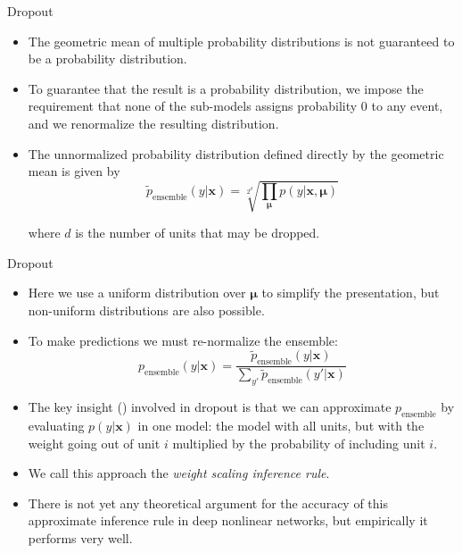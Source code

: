 \documentclass[10pt]{beamer}
\begin{document}
	\begin{frame}{Dropout}
		\begin{itemize}
			\item The geometric mean of multiple probability distributions is not guaranteed to be a probability distribution.
			\pause
			\item To guarantee that the result is a probability distribution, we impose the requirement that none of the sub-models assigns probability 0 to any event, and we renormalize the resulting distribution.
			\pause
			\item The unnormalized probability distribution defined directly by the geometric mean is given by
			$$\tilde{p}_{\text{ensemble}}(y|\bm{x})=\sqrt[2^d]{\prod_{\bm{\mu}}p(y|\bm{x},\bm{\mu})}$$
			
			where $d$ is the number of units that may be dropped.
		\end{itemize}
	\end{frame}
	
	\begin{frame}{Dropout}
		\begin{itemize}
			\item Here we use a uniform distribution over $\bm{\mu}$ to simplify the presentation, but non-uniform distributions are also possible.
			\pause
			\item To make predictions we must re-normalize the ensemble:
			$$p_{\text{ensemble}}(y|\bm{x})=\frac{\tilde{p}_{\text{ensemble}}(y|\bm{x})}{\sum_{y'}\tilde{p}_{\text{ensemble}}(y'|\bm{x})}$$
			
			\pause
			\item The key insight (\citet{hinton2012improving}) involved in dropout is that we can approximate $p_{\text{ensemble}}$ by evaluating $p(y|\bm{x})$ in one model: the model with all units, but with the weight going out of unit $i$ multiplied by the probability of including unit $i$.
			\pause
			
			\item We call this approach the \emph{weight scaling inference rule}.
			\pause
			\item There is not yet any theoretical argument for the accuracy of this approximate inference rule in deep nonlinear networks, but empirically it performs very well.
		\end{itemize}
	\end{frame}
	
\end{document}
